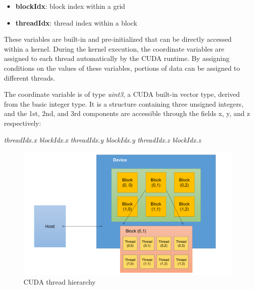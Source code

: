 \begin{itemize}
    \item \textbf{blockIdx}: block index within a grid
    \item \textbf{threadIdx}: thread index within a block
\end{itemize}

These variables are built-in and pre-initialized that can be directly accessed within a kernel. During the kernel execution, the coordinate variables are assigned to each thread automatically by the CUDA runtime. By assigning conditions on the values of these variables, portions of data can be assigned to different threads.

The coordinate variable is of type \textit{uint3}, a CUDA built-in vector type, derived from the basic integer type. It is a structure containing three unsigned integers, and the 1st, 2nd, and 3rd components are accessible through the fields x, y, and z respectively:


% 
\textit{threadIdx.x    blockIdx.x} \newline
\textit{threadIdx.y    blockIdx.y} \newline
\textit{threadIdx.z    blockIdx.z}

\begin{figure}[ht]
	\centering
	\includegraphics[scale=0.30]{Pictures/ch2/cuda_thread_hierarchy.png}
	\caption{\small CUDA thread hierarchy}
\end{figure}

% 

